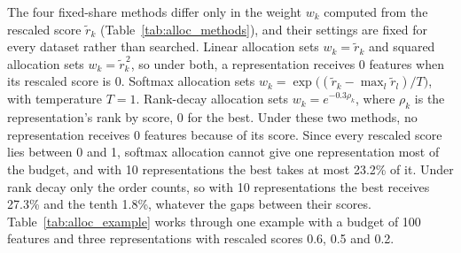 The four fixed-share methods differ only in the weight $w_k$ computed from the rescaled score $\tilde r_k$ (Table~\ref{tab:alloc_methods}), and their settings are fixed for every dataset rather than searched. Linear allocation sets $w_k = \tilde r_k$ and squared allocation sets $w_k = \tilde r_k^{\,2}$, so under both, a representation receives 0 features when its rescaled score is 0. Softmax allocation sets $w_k = \exp\big((\tilde r_k - \max_l \tilde r_l)/T\big)$, with temperature $T = 1$. Rank-decay allocation sets $w_k = e^{-0.3\rho_k}$, where $\rho_k$ is the representation's rank by score, 0 for the best. Under these two methods, no representation receives 0 features because of its score. Since every rescaled score lies between 0 and 1, softmax allocation cannot give one representation most of the budget, and with 10 representations the best takes at most 23.2\% of it. Under rank decay only the order counts, so with 10 representations the best receives 27.3\% and the tenth 1.8\%, whatever the gaps between their scores. Table~\ref{tab:alloc_example} works through one example with a budget of 100 features and three representations with rescaled scores 0.6, 0.5 and 0.2.

